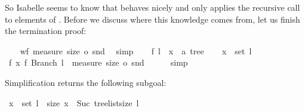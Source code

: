 \begin{isabellebody}
\begin{isamarkuptxt}
  So Isabelle seems to know that  behaves nicely and only
  applies the recursive call  to elements
  of . Before we discuss where this knowledge comes from,
  let us finish the termination proof:%
\end{isamarkuptxt}%
\isamarkuptrue%
\ \ \isamarkupfalse%
\ {\isachardoublequoteopen}wf\ {\isacharparenleft}measure\ {\isacharparenleft}size\ o\ snd{\isacharparenright}{\isacharparenright}{\isachardoublequoteclose}\ \isamarkupfalse%
\ simp\isanewline
{}\isamarkupfalse%
\isanewline
\ \ \isamarkupfalse%
\ f\ l\ \ x\ {\isacharcolon}{\isacharcolon}\ {\isachardoublequoteopen}{\isacharprime}a\ tree{\isachardoublequoteclose}\isanewline
\ \ \isamarkupfalse%
\ {\isachardoublequoteopen}x\ {\isasymin}\ set\ l{\isachardoublequoteclose}\isanewline
\ \ \isamarkupfalse%
\ {\isachardoublequoteopen}{\isacharparenleft}{\isacharparenleft}f{\isacharcomma}\ x{\isacharparenright}{\isacharcomma}\ {\isacharparenleft}f{\isacharcomma}\ Branch\ l{\isacharparenright}{\isacharparenright}\ {\isasymin}\ measure\ {\isacharparenleft}size\ o\ snd{\isacharparenright}{\isachardoublequoteclose}\isanewline
\ \ \ \ \isamarkupfalse%
\ simp%
\begin{isamarkuptxt}%
Simplification returns the following subgoal: 

      \begin{isabelle}%
{}{\isachardot}\ x\ {\isasymin}\ set\ l\ {\isasymLongrightarrow}\ size\ x\ {\isacharless}\ Suc\ {\isacharparenleft}tree{\isacharunderscore}list{\isacharunderscore}size\ l{\isacharparenright}%
\end{isabelle} 


\end{isamarkuptxt}
\end{isabellebody}
